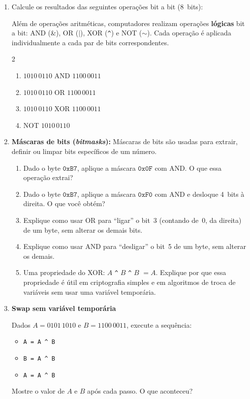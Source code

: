 \documentclass[11pt, a4paper]{article}
\begin{document}
\begin{enumerate}
\item Calcule os resultados das seguintes opera\c{c}\~{o}es bit a bit (8~bits):
\begin{contexto}
Al\'{e}m de opera\c{c}\~{o}es aritm\'{e}ticas, computadores realizam opera\c{c}\~{o}es \textbf{l\'{o}gicas} bit a bit: AND (\&), OR ($|$), XOR (\texttt{\^{}}) e NOT ($\sim$). Cada opera\c{c}\~{a}o \'{e} aplicada individualmente a cada par de bits correspondentes.
\end{contexto}
\vspace{-2pt}
\begin{multicols}{2}
\begin{enumerate}
  \item $1010\,0110$ AND $1100\,0011$
  \item $1010\,0110$ OR $1100\,0011$
  \item $1010\,0110$ XOR $1100\,0011$
  \item NOT $1010\,0110$
\end{enumerate}
\end{multicols}

\item \textbf{M\'{a}scaras de bits (\emph{bitmasks}):} M\'{a}scaras de bits s\~{a}o usadas para extrair, definir ou limpar bits espec\'{i}ficos de um n\'{u}mero.
\begin{enumerate}
  \item Dado o byte $\texttt{0xB7}$, aplique a m\'{a}scara $\texttt{0x0F}$ com AND. O que essa opera\c{c}\~{a}o extrai?
  \item Dado o byte $\texttt{0xB7}$, aplique a m\'{a}scara $\texttt{0xF0}$ com AND e desloque 4~bits \`{a} direita. O que voc\^{e} obt\'{e}m?
  \item Explique como usar OR para ``ligar'' o bit~3 (contando de~0, da direita) de um byte, sem alterar os demais bits.
  \item Explique como usar AND para ``desligar'' o bit~5 de um byte, sem alterar os demais.
  \item Uma propriedade do XOR: $A$ \texttt{\^{}} $B$ \texttt{\^{}} $B$ $= A$. Explique por que essa propriedade \'{e} \'{u}til em criptografia simples e em algoritmos de troca de vari\'{a}veis sem usar uma vari\'{a}vel tempor\'{a}ria.
\end{enumerate}
\item \textbf{Swap sem vari\'{a}vel tempor\'{a}ria}

Dados $A = 0101\,1010$ e $B = 1100\,0011$, execute a sequ\^{e}ncia:
\begin{itemize}[label=$\bullet$]
  \item \texttt{A = A \^{} B}
  \item \texttt{B = A \^{} B}
  \item \texttt{A = A \^{} B}
\end{itemize}
\vspace{-2pt}
Mostre o valor de $A$ e $B$ ap\'{o}s cada passo. O que aconteceu?


\end{enumerate}
\end{document}
